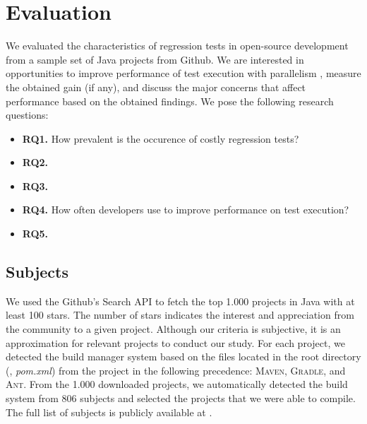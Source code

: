 \section{Evaluation}
\label{sec:eval}

We evaluated the characteristics of regression tests in open-source
development from a sample set of Java projects from Github. We are
interested in opportunities to improve performance of test execution
with parallelism , measure the
obtained gain (if any), and discuss the major concerns that affect
performance based on the obtained findings.  We pose the following
research questions:

\newcommand{\RQONE}{How prevalent is the occurence of costly
regression tests?}
\newcommand{\rqOne}{\textbf{RQ1.} \RQONE}

\newcommand{\RQTWO}{\Fix{...}}
\newcommand{\rqTwo}{\textbf{RQ2.} \RQTWO{}}

\newcommand{\RQTHREE}{\Fix{...}}
\newcommand{\rqThree}{\textbf{RQ3.} \RQTHREE{}}

\newcommand{\RQFOUR}{How often developers use \Fix{...} to
improve performance on test execution?}
\newcommand{\rqFour}{\textbf{RQ4.} \RQFOUR{}}

\newcommand{\RQFIVE}{\Fix{...}}
\newcommand{\rqFive}{\textbf{RQ5.} \RQFIVE{}}

\begin{itemize}
    \item \rqOne
    \item \rqTwo
    \item \rqThree
    \item \rqFour
    \item \rqFive
\end{itemize}


\subsection{Subjects}
\label{sec:subjects}

We used the Github's Search API to fetch the top 1.000 projects in
Java with at least 100 stars. The number of stars indicates the
interest and appreciation from the community to a given project.
 Although our
criteria is subjective, it is an approximation for relevant projects
to conduct our study. For each project, we detected the build manager
system based on the files located in the root directory (\eg,
\emph{pom.xml}) from the project in the following precedence:
\textsc{Maven}, \textsc{Gradle}, and \textsc{Ant}. From the 1.000
downloaded projects, we automatically detected the build system from
806 subjects and selected the  projects that we were able to
compile.  The full list of subjects is publicly available at
.

